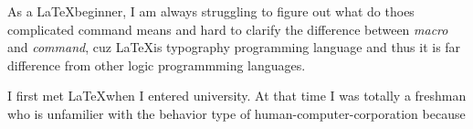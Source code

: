     As a \LaTeX beginner, I am always struggling  to figure out what do thoes complicated command means and hard to clarify the difference between \emph{macro} and \emph{command}, cuz \LaTeX is typography programming language and thus it is far difference from other logic programmming languages. 

    I first met \LaTeX when I entered university. At that time I was totally a freshman who is unfamilier with the behavior type of human-computer-corporation because 